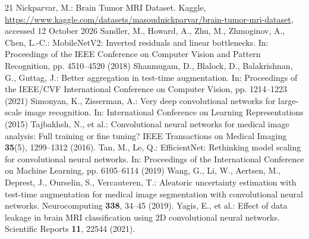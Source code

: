 \begin{thebibliography}{21}
 Nickparvar, M.: Brain Tumor MRI Dataset. Kaggle, \url{https://www.kaggle.com/datasets/masoudnickparvar/brain-tumor-mri-dataset}, accessed 12 October 2026
 Sandler, M., Howard, A., Zhu, M., Zhmoginov, A., Chen, L.-C.: MobileNetV2: Inverted residuals and linear bottlenecks. In: Proceedings of the IEEE Conference on Computer Vision and Pattern Recognition, pp. 4510--4520 (2018)
 Shanmugam, D., Blalock, D., Balakrishnan, G., Guttag, J.: Better aggregation in test-time augmentation. In: Proceedings of the IEEE/CVF International Conference on Computer Vision, pp. 1214--1223 (2021)
 Simonyan, K., Zisserman, A.: Very deep convolutional networks for large-scale image recognition. In: International Conference on Learning Representations (2015)
 Tajbakhsh, N., et al.: Convolutional neural networks for medical image analysis: Full training or fine tuning? IEEE Transactions on Medical Imaging \textbf{35}(5), 1299--1312 (2016). 
 Tan, M., Le, Q.: EfficientNet: Rethinking model scaling for convolutional neural networks. In: Proceedings of the International Conference on Machine Learning, pp. 6105--6114 (2019)
 Wang, G., Li, W., Aertsen, M., Deprest, J., Ourselin, S., Vercauteren, T.: Aleatoric uncertainty estimation with test-time augmentation for medical image segmentation with convolutional neural networks. Neurocomputing \textbf{338}, 34--45 (2019). 
 Yagis, E., et al.: Effect of data leakage in brain MRI classification using 2D convolutional neural networks. Scientific Reports \textbf{11}, 22544 (2021). 
\end{thebibliography}

